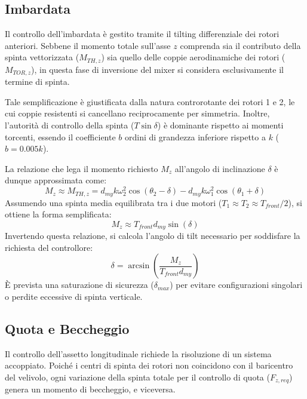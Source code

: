 \subsection{Imbardata}
Il controllo dell'imbardata è gestito tramite il tilting differenziale dei rotori anteriori. 
Sebbene il momento totale sull'asse $z$ comprenda sia il contributo della spinta vettorizzata ($M_{TH,z}$) sia quello delle coppie aerodinamiche dei rotori ($M_{TOR,z}$), in questa fase di inversione del mixer si considera esclusivamente il termine di spinta.

Tale semplificazione è giustificata dalla natura controrotante dei rotori 1 e 2, le cui coppie resistenti si cancellano reciprocamente 
per simmetria. Inoltre, l'autorità di controllo della spinta ($T \sin \delta$) è dominante rispetto ai momenti torcenti, 
essendo il coefficiente $b$ ordini di grandezza inferiore rispetto a $k$ ($b = 0.005k$). 

La relazione che lega il momento richiesto $M_z$ all'angolo di inclinazione $\delta$ è dunque approssimata come:
\begin{equation}
    M_{z} \approx M_{TH,z} = d_{my} k \omega_2^2 \cos(\theta_2 - \delta) - d_{my} k \omega_1^2 \cos(\theta_1 + \delta)
\end{equation}
Assumendo una spinta media equilibrata tra i due motori ($T_1 \approx T_2 \approx T_{front}/2$), si ottiene la forma semplificata:
\begin{equation}
    M_z \approx T_{front} d_{my} \sin(\delta)
\end{equation}
Invertendo questa relazione, si calcola l'angolo di tilt necessario per soddisfare la richiesta del controllore:
\begin{equation}
    \delta = \arcsin\left( \frac{M_z}{T_{front} d_{my}} \right)
\end{equation}
È prevista una saturazione di sicurezza ($\delta_{max}$) per evitare configurazioni singolari o perdite eccessive di spinta verticale.


\subsection{Quota e Beccheggio}
Il controllo dell'assetto longitudinale richiede la risoluzione di un sistema accoppiato. Poiché i centri di spinta dei rotori non coincidono con il baricentro del velivolo, ogni variazione della spinta totale per il controllo di quota ($F_{z,req}$) genera un momento di beccheggio, e viceversa.

